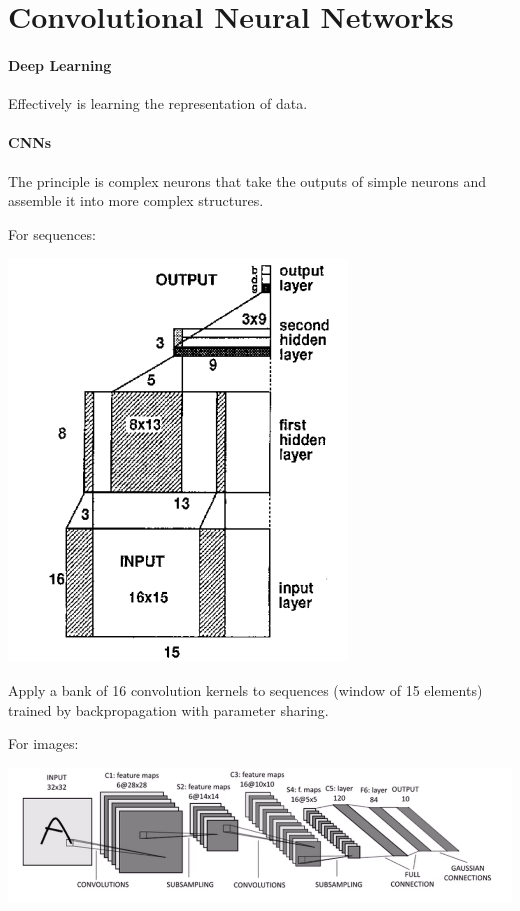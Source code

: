 \documentclass[10pt]{report}
\begin{document}
\section{Convolutional Neural Networks}
\paragraph{Deep Learning} Effectively is learning the representation of data.
\paragraph{CNNs} The principle is complex neurons that take the outputs of simple neurons and assemble it into more complex structures.
\begin{multicols}{2}
For sequences:
\begin{center}
	\includegraphics[scale=0.5]{66.png}
\end{center}
Apply a bank of 16 convolution kernels to sequences (window of 15 elements) trained by backpropagation with parameter sharing.
\columnbreak

For images:
\begin{center}
	\includegraphics[scale=0.35]{50.png}
\end{center}
\end{multicols}
\end{document}
